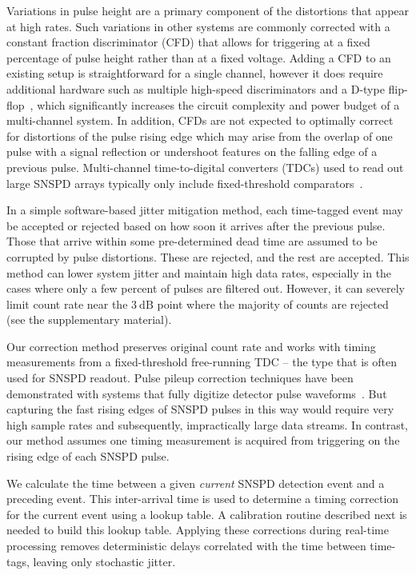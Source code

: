 \documentclass[11pt]{caltech_thesis} %
\begin{document}
Variations in pulse height are a primary component of the distortions that appear at high rates. Such variations in other systems are commonly corrected with a constant fraction discriminator (CFD) that allows for triggering at a fixed percentage of pulse height rather than at a fixed voltage. Adding a CFD to an existing setup is straightforward for a single channel, however it does require additional hardware such as multiple high-speed discriminators and a D-type flip-flop~\autocite{Becker2005}, which significantly increases the circuit complexity and power budget of a multi-channel system. In addition, CFDs are not expected to optimally correct for distortions of the pulse rising edge which may arise from the overlap of one pulse with a signal reflection or undershoot features on the falling edge of a previous pulse. Multi-channel time-to-digital converters (TDCs) used to read out large SNSPD arrays typically only include fixed-threshold comparators~\autocite{Wollman2019}.

In a simple software-based jitter mitigation method, each time-tagged event may be accepted or rejected based on how soon it arrives after the previous pulse. Those that arrive within some pre-determined dead time are assumed to be corrupted by pulse distortions. These are rejected, and the rest are accepted. This method can lower system jitter and maintain high data rates, especially in the cases where only a few percent of pulses are filtered out. However, it can severely limit count rate near the $3~\mathrm{dB}$ point where the majority of counts are rejected (see the supplementary material).

Our correction method preserves original count rate and works with timing measurements from a fixed-threshold free-running TDC -- the type that is often used for SNSPD readout. Pulse pileup correction techniques have been demonstrated with systems that fully digitize detector pulse waveforms~\autocite{Behbahani2019,scoullar_evans_2009,Haselman2010}. But capturing the fast rising edges of SNSPD pulses in this way would require very high sample rates and subsequently, impractically large data streams. In contrast, our method assumes one timing measurement is acquired from triggering on the rising edge of each SNSPD pulse.

We calculate the time between a given \emph{current} SNSPD detection event and a preceding event. This inter-arrival time is used to determine a timing correction for the current event using a lookup table. A calibration routine described next is needed to build this lookup table. Applying these corrections during real-time processing removes deterministic delays correlated with the time between time-tags, leaving only stochastic jitter.
\end{document}
